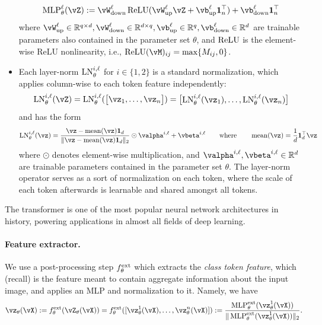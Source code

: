 \documentclass[../../book-main.tex]{subfiles}
\begin{document}
\begin{itemize}
    \begin{equation}
        \MLP_{\theta}^{\ell}(\vZ) := \vW_{\down}^{\ell}\ReLU(\vW_{\up}^{\ell}\vZ + \vb_{\up}^{\ell}\vone_{n}^{\top}) + \vb_{\down}^{\ell}\vone_{n}^{\top}
    \end{equation}
    where \(\vW_{\up}^{\ell} \in \R^{q \times d}, \vW_{\down}^{\ell} \in \R^{d \times q}, \vb_{\up}^{\ell} \in \R^{q}, \vb_{\down}^{\ell} \in \R^{d}\) are trainable parameters also contained in the parameter set \(\theta\), and \(\operatorname{ReLU}\) is the element-wise ReLU nonlinearity, i.e., \(\ReLU(\vM)_{ij} = \max\{M_{ij}, 0\}\). 
    \item Each layer-norm \(\operatorname{LN}_{\theta}^{i, \ell}\) for \(i \in \{1, 2\}\) is a standard normalization, which applies column-wise to each token feature independently:
    \begin{equation}
        \LN_{\theta}^{i, \ell}(\vZ) = \LN_{\theta}^{i, \ell}(\mat{\vz_{1}, \dots, \vz_{n}}) = \mat{\LN_{\theta}^{i, \ell}(\vz_{1}), \dots, \LN_{\theta}^{i, \ell}(\vz_{n})}
    \end{equation}
    and has the form 
    \begin{equation}
        \LN_{\theta}^{i, \ell}(\vz) = \frac{\vz - \operatorname{mean}(\vz)\vone_{d}}{\norm{\vz - \operatorname{mean}(\vz)\vone_{d}}_{2}} \odot \valpha^{i, \ell} + \vbeta^{i, \ell} \qquad \text{where} \qquad \operatorname{mean}(\vz) = \frac{1}{d}\vone_{d}^{\top}\vz
    \end{equation}
    where \(\odot\) denotes element-wise multiplication, and \(\valpha^{i, \ell}, \vbeta^{i, \ell} \in \R^{d}\) are trainable parameters contained in the parameter set \(\theta\). The layer-norm operator serves as a sort of normalization on each token, where the scale of each token afterwards is learnable and shared amongst all tokens. 
\end{itemize}

The transformer is one of the most popular neural network architectures in history, powering applications in almost all fields of deep learning. 

\paragraph{Feature extractor.} We use a post-processing step \(f_{\theta}^{\mathrm{ext}}\) which extracts the \textit{class token feature}, which (recall) is the feature meant to contain aggregate information about the input image, and applies an MLP and normalization to it. Namely, we have 
\begin{equation}
    \vz_{\theta}(\vX) := f_{\theta}^{\ext}(\vZ_{\theta}(\vX)) = f_{\theta}^{\ext}([\vz_{\theta}^{1}(\vX), \dots, \vz_{\theta}^{n}(\vX)]) := \frac{\MLP_{\theta}^{\ext}(\vz_{\theta}^{1}(\vX))}{\norm{\MLP_{\theta}^{\ext}(\vz_{\theta}^{1}(\vX))}_{2}}.
\end{equation} 
\end{document}
